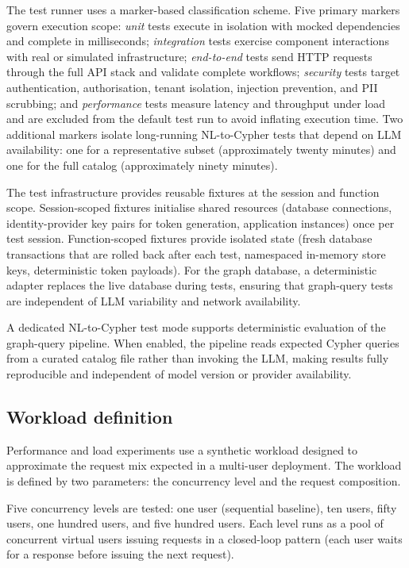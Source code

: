 \documentclass[a4paper]{sapthesis}
\begin{document}
The test runner uses a marker-based classification scheme.  Five primary
markers govern execution scope: \emph{unit} tests execute in isolation
with mocked dependencies and complete in milliseconds; \emph{integration}
tests exercise component interactions with real or simulated
infrastructure; \emph{end-to-end} tests send HTTP requests through the
full API stack and validate complete workflows;
\emph{security} tests target authentication, authorisation, tenant
isolation, injection prevention, and PII scrubbing; and
\emph{performance} tests measure latency and throughput under load and
are excluded from the default test run to avoid inflating execution time.
Two additional markers isolate long-running NL-to-Cypher tests that depend
on LLM availability: one for a representative subset (approximately twenty
minutes) and one for the full catalog (approximately ninety minutes).

The test infrastructure provides reusable fixtures at the session and
function scope.  Session-scoped fixtures initialise shared resources
(database connections, identity-provider key pairs for token generation,
application instances) once per test session.  Function-scoped fixtures
provide isolated state (fresh database transactions that are rolled back
after each test, namespaced in-memory store keys, deterministic token
payloads).  For the graph database, a deterministic adapter replaces the
live database during tests, ensuring that graph-query tests are
independent of LLM variability and network availability.

A dedicated NL-to-Cypher test mode supports deterministic evaluation of
the graph-query pipeline.  When enabled, the pipeline reads expected
Cypher queries from a curated catalog file rather than invoking the LLM,
making results fully reproducible and independent of model version or
provider availability.

\subsection{Workload definition}

Performance and load experiments use a synthetic workload designed to
approximate the request mix expected in a multi-user deployment.  The
workload is defined by two parameters: the concurrency level and the
request composition.

Five concurrency levels are tested: one user (sequential baseline), ten
users, fifty users, one hundred users, and five hundred users.  Each
level runs as a pool of concurrent virtual users issuing requests in a
closed-loop pattern (each user waits for a response before issuing the
next request).
\end{document}
